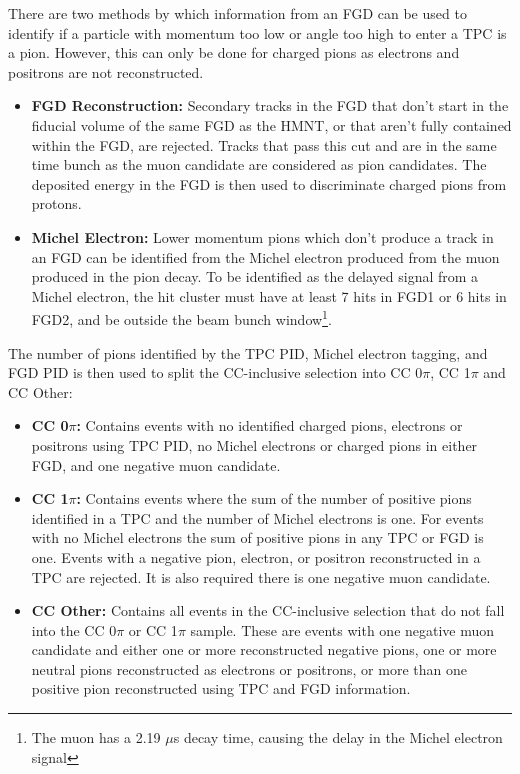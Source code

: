 \begin{itemize}
There are two methods by which information from an FGD can be used to identify if a particle with momentum too low or angle too high to enter a TPC is a pion. However, this can only be done for charged pions as electrons and positrons are not reconstructed. 

\begin{itemize}

\item \textbf{FGD Reconstruction:} Secondary tracks in the FGD that don't start in the fiducial volume of the same FGD as the HMNT, or that aren't fully contained within the FGD, are rejected. Tracks that pass this cut and are in the same time bunch as the muon candidate are considered as pion candidates. The deposited energy in the FGD is then used to discriminate charged pions from protons.

\item \textbf{Michel Electron:} Lower momentum pions which don't produce a track in an FGD can be identified from the Michel electron produced from the muon produced in the pion decay. To be identified as the delayed signal from a Michel electron, the hit cluster must have at least 7 hits in FGD1 or 6 hits in FGD2, and be outside the beam bunch window\footnote{The muon has a 2.19 $\mu$s decay time, causing the delay in the Michel electron signal}.

\end{itemize}
\end{itemize}

The number of pions identified by the TPC PID, Michel electron tagging, and FGD PID is then used to split the CC-inclusive selection into CC 0$\pi$, CC 1$\pi$ and CC Other:

\begin{itemize}

\item \textbf{CC 0$\pi$:} Contains events with no identified charged pions, electrons or positrons using TPC PID, no Michel electrons or charged pions in either FGD, and one negative muon candidate. 

\item \textbf{CC 1$\pi$:} Contains events where the sum of the number of positive pions identified in a TPC and the number of Michel electrons is one. For events with no Michel electrons the sum of positive pions in any TPC or FGD is one. Events with a negative pion, electron, or positron reconstructed in a TPC are rejected. It is also required there is one negative muon candidate.

\item \textbf{CC Other:} Contains all events in the CC-inclusive selection that do not fall into the CC 0$\pi$ or CC 1$\pi$ sample. These are events with one negative muon candidate and either one or more reconstructed negative pions, one or more neutral pions reconstructed as electrons or positrons, or more than one positive pion reconstructed using TPC and FGD information.

\end{itemize}

